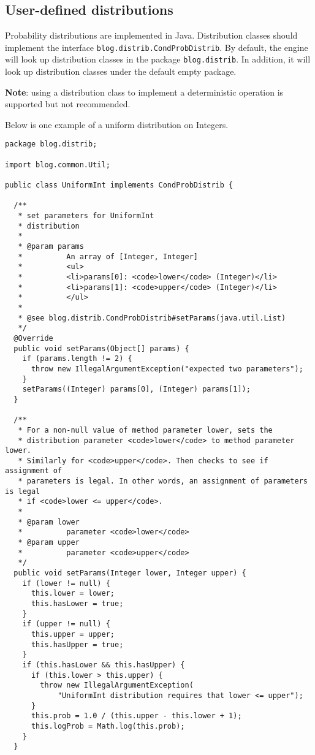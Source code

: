 \documentclass[12pt]{article}
\begin{document}
\subsection{User-defined distributions}\label{user-defined-distribution-section}
Probability distributions are implemented in Java.  Distribution classes should implement the interface \verb|blog.distrib.CondProbDistrib|. 
By default, the \bl engine will look up distribution classes in the package \verb|blog.distrib|. In addition, it will look up distribution classes under the default empty package. 

{\bf Note}: using a distribution class to implement a deterministic operation is supported but not recommended. 

Below is one example of a uniform distribution on Integers.
\begin{verbatim}
package blog.distrib;

import blog.common.Util;

public class UniformInt implements CondProbDistrib {

  /**
   * set parameters for UniformInt
   * distribution
   * 
   * @param params
   *          An array of [Integer, Integer]
   *          <ul>
   *          <li>params[0]: <code>lower</code> (Integer)</li>
   *          <li>params[1]: <code>upper</code> (Integer)</li>
   *          </ul>
   * 
   * @see blog.distrib.CondProbDistrib#setParams(java.util.List)
   */
  @Override
  public void setParams(Object[] params) {
    if (params.length != 2) {
      throw new IllegalArgumentException("expected two parameters");
    }
    setParams((Integer) params[0], (Integer) params[1]);
  }

  /**
   * For a non-null value of method parameter lower, sets the
   * distribution parameter <code>lower</code> to method parameter lower.
   * Similarly for <code>upper</code>. Then checks to see if assignment of
   * parameters is legal. In other words, an assignment of parameters is legal
   * if <code>lower <= upper</code>.
   * 
   * @param lower
   *          parameter <code>lower</code>
   * @param upper
   *          parameter <code>upper</code>
   */
  public void setParams(Integer lower, Integer upper) {
    if (lower != null) {
      this.lower = lower;
      this.hasLower = true;
    }
    if (upper != null) {
      this.upper = upper;
      this.hasUpper = true;
    }
    if (this.hasLower && this.hasUpper) {
      if (this.lower > this.upper) {
        throw new IllegalArgumentException(
            "UniformInt distribution requires that lower <= upper");
      }
      this.prob = 1.0 / (this.upper - this.lower + 1);
      this.logProb = Math.log(this.prob);
    }
  }


\end{verbatim}
\end{document}
